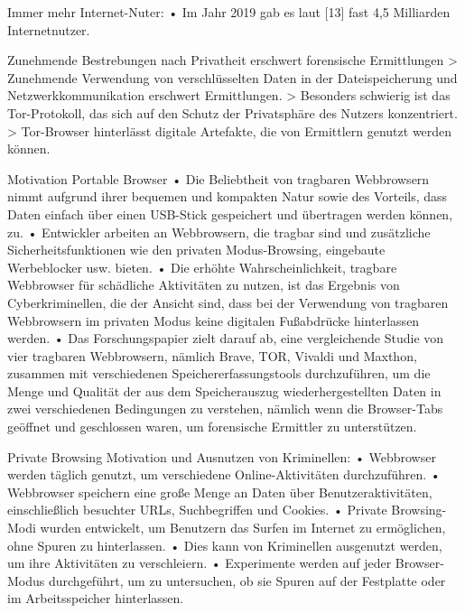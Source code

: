 Immer mehr Internet-Nuter:\cite{Izzati.2022}
	•	Im Jahr 2019 gab es laut [13] fast 4,5 Milliarden Internetnutzer.

Zunehmende Bestrebungen nach Privatheit erschwert forensische Ermittlungen \cite{Muir.2019}
	> Zunehmende Verwendung von verschlüsselten Daten in der Dateispeicherung und Netzwerkkommunikation erschwert Ermittlungen.
	> Besonders schwierig ist das Tor-Protokoll, das sich auf den Schutz der Privatsphäre des Nutzers konzentriert.
	> Tor-Browser hinterlässt digitale Artefakte, die von Ermittlern genutzt werden können.


Motivation Portable Browser \cite{Hariharan.2022}
	•	Die Beliebtheit von tragbaren Webbrowsern nimmt aufgrund ihrer bequemen und kompakten Natur sowie des Vorteils, dass Daten einfach über einen USB-Stick gespeichert und übertragen werden können, zu.
	•	Entwickler arbeiten an Webbrowsern, die tragbar sind und zusätzliche Sicherheitsfunktionen wie den privaten Modus-Browsing, eingebaute Werbeblocker usw. bieten.
	•	Die erhöhte Wahrscheinlichkeit, tragbare Webbrowser für schädliche Aktivitäten zu nutzen, ist das Ergebnis von Cyberkriminellen, die der Ansicht sind, dass bei der Verwendung von tragbaren Webbrowsern im privaten Modus keine digitalen Fußabdrücke hinterlassen werden.
	•	Das Forschungspapier zielt darauf ab, eine vergleichende Studie von vier tragbaren Webbrowsern, nämlich Brave, TOR, Vivaldi und Maxthon, zusammen mit verschiedenen Speichererfassungstools durchzuführen, um die Menge und Qualität der aus dem Speicherauszug wiederhergestellten Daten in zwei verschiedenen Bedingungen zu verstehen, nämlich wenn die Browser-Tabs geöffnet und geschlossen waren, um forensische Ermittler zu unterstützen.


Private Browsing Motivation und Ausnutzen von Kriminellen: \cite{Montasari.2015}
	•	Webbrowser werden täglich genutzt, um verschiedene Online-Aktivitäten durchzuführen.
	•	Webbrowser speichern eine große Menge an Daten über Benutzeraktivitäten, einschließlich besuchter URLs, Suchbegriffen und Cookies.
	•	Private Browsing-Modi wurden entwickelt, um Benutzern das Surfen im Internet zu ermöglichen, ohne Spuren zu hinterlassen.
	•	Dies kann von Kriminellen ausgenutzt werden, um ihre Aktivitäten zu verschleiern.
	•	Experimente werden auf jeder Browser-Modus durchgeführt, um zu untersuchen, ob sie Spuren auf der Festplatte oder im Arbeitsspeicher hinterlassen.


